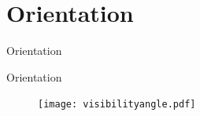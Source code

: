 \section{Orientation}

\begin{frame}{Orientation}{}
\centering
\begin{figure}[!htb]%
\label{fig:prototype2-app-screenshots}
\end{figure}
\end{frame}

\begin{frame}{Orientation}{}
\centering
\begin{figure}[!htb]
    \centering
    \texttt{[image: visibilityangle.pdf]}
\label{fig:visibilityangle}
\end{figure}
\end{frame}